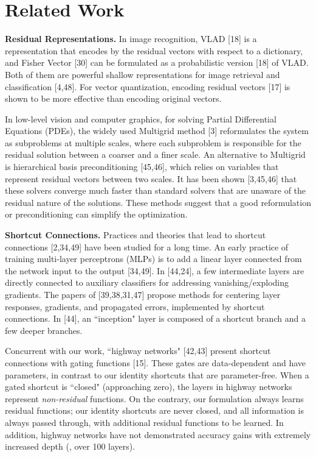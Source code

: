 \section{Related Work}
\label{sec:related}

\noindent\textbf{Residual Representations.}
In image recognition, VLAD [18] is a representation that encodes by the residual vectors with respect to a dictionary, and Fisher Vector [30] can be formulated as a probabilistic version [18] of VLAD.
Both of them are powerful shallow representations for image retrieval and classification [4,48].
For vector quantization, encoding residual vectors [17] is shown to be more effective than encoding original vectors.

In low-level vision and computer graphics, for solving Partial Differential Equations (PDEs), the widely used Multigrid method [3] reformulates the system as subproblems at multiple scales, where each subproblem is responsible for the residual solution between a coarser and a finer scale. An alternative to Multigrid is hierarchical basis preconditioning [45,46], which relies on variables that represent residual vectors between two scales. It has been shown [3,45,46] that these solvers converge much faster than standard solvers that are unaware of the residual nature of the solutions. These methods suggest that a good reformulation or preconditioning can simplify the optimization.

\vspace{6pt}
\noindent\textbf{Shortcut Connections.}
Practices and theories that lead to shortcut connections [2,34,49] have been studied for a long time.
An early practice of training multi-layer perceptrons (MLPs) is to add a linear layer connected from the network input to the output [34,49]. In [44,24], a few intermediate layers are directly connected to auxiliary classifiers for addressing vanishing/exploding gradients. The papers of [39,38,31,47] propose methods for centering layer responses, gradients, and propagated errors, implemented by shortcut connections. In [44], an ``inception" layer is composed of a shortcut branch and a few deeper branches.

Concurrent with our work, ``highway networks" [42,43] present shortcut connections with gating functions [15]. These gates are data-dependent and have parameters, in contrast to our identity shortcuts that are parameter-free. When a gated shortcut is ``closed" (approaching zero), the layers in highway networks represent \emph{non-residual} functions. On the contrary, our formulation always learns residual functions; our identity shortcuts are never closed, and all information is always passed through, with additional residual functions to be learned. In addition, highway networks have not demonstrated accuracy gains with extremely increased depth (\eg, over 100 layers).




